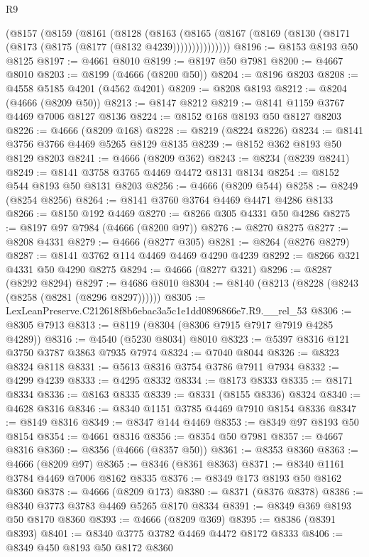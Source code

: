 \begin{lexlean}{R9}
\begin{coremodule}
      (@8157
        (@8159
          (@8161
            (@8128
              (@8163
                (@8165 (@8167 (@8169 (@8130 (@8171 (@8173 (@8175 (@8177 (@8132 @4239)))))))))))))))
@8196 := @8153 @8193 @50 @8125
@8197 := @4661 @8010
@8199 := @8197 @50 @7981
@8200 := @4667 @8010
@8203 := @8199 (@4666 (@8200 @50))
@8204 := @8196 @8203
@8208 := @4558 @5185 @4201 (@4562 @4201)
@8209 := @8208 @8193
@8212 := @8204 (@4666 (@8209 @50))
@8213 := @8147 @8212
@8219 := @8141 @1159 @3767 @4469 @7006 @8127 @8136
@8224 := @8152 @168 @8193 @50 @8127 @8203
@8226 := @4666 (@8209 @168)
@8228 := @8219 (@8224 @8226)
@8234 := @8141 @3756 @3766 @4469 @5265 @8129 @8135
@8239 := @8152 @362 @8193 @50 @8129 @8203
@8241 := @4666 (@8209 @362)
@8243 := @8234 (@8239 @8241)
@8249 := @8141 @3758 @3765 @4469 @4472 @8131 @8134
@8254 := @8152 @544 @8193 @50 @8131 @8203
@8256 := @4666 (@8209 @544)
@8258 := @8249 (@8254 @8256)
@8264 := @8141 @3760 @3764 @4469 @4471 @4286 @8133
@8266 := @8150 @192 @4469
@8270 := @8266 @305 @4331 @50 @4286
@8275 := @8197 @97 @7984 (@4666 (@8200 @97))
@8276 := @8270 @8275
@8277 := @8208 @4331
@8279 := @4666 (@8277 @305)
@8281 := @8264 (@8276 @8279)
@8287 := @8141 @3762 @114 @4469 @4469 @4290 @4239
@8292 := @8266 @321 @4331 @50 @4290 @8275
@8294 := @4666 (@8277 @321)
@8296 := @8287 (@8292 @8294)
@8297 := @4686 @8010
@8304 := @8140 (@8213 (@8228 (@8243 (@8258 (@8281 (@8296 @8297))))))
@8305 := LexLeanPreserve.C212618f8b6ebac3a5c1e1dd0896866e7.R9.__rel_53
@8306 := @8305 @7913
@8313 := @8119 (@8304 (@8306 @7915 @7917 @7919 @4285 @4289))
@8316 := @4540 (@5230 @8034) @8010
@8323 := @5397 @8316 @121 @3750 @3787 @3863 @7935 @7974
@8324 := @7040 @8044
@8326 := @8323 @8324 @8118
@8331 := @5613 @8316 @3754 @3786 @7911 @7934
@8332 := @4299 @4239
@8333 := @4295 @8332
@8334 := @8173 @8333
@8335 := @8171 @8334
@8336 := @8163 @8335
@8339 := @8331 (@8155 @8336) @8324
@8340 := @4628 @8316
@8346 := @8340 @1151 @3785 @4469 @7910 @8154 @8336
@8347 := @8149 @8316
@8349 := @8347 @144 @4469
@8353 := @8349 @97 @8193 @50 @8154
@8354 := @4661 @8316
@8356 := @8354 @50 @7981
@8357 := @4667 @8316
@8360 := @8356 (@4666 (@8357 @50))
@8361 := @8353 @8360
@8363 := @4666 (@8209 @97)
@8365 := @8346 (@8361 @8363)
@8371 := @8340 @1161 @3784 @4469 @7006 @8162 @8335
@8376 := @8349 @173 @8193 @50 @8162 @8360
@8378 := @4666 (@8209 @173)
@8380 := @8371 (@8376 @8378)
@8386 := @8340 @3773 @3783 @4469 @5265 @8170 @8334
@8391 := @8349 @369 @8193 @50 @8170 @8360
@8393 := @4666 (@8209 @369)
@8395 := @8386 (@8391 @8393)
@8401 := @8340 @3775 @3782 @4469 @4472 @8172 @8333
@8406 := @8349 @450 @8193 @50 @8172 @8360

\end{coremodule}
\end{lexlean}
